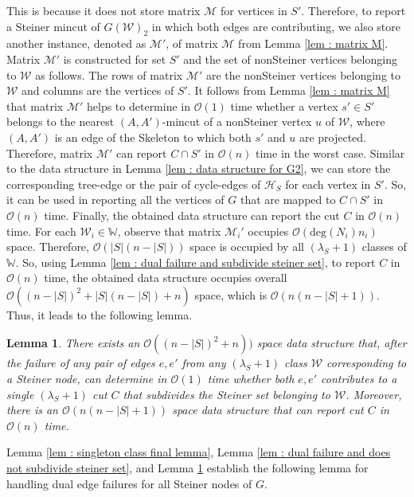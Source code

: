 \documentclass[letterpaper,11pt]{article}
\newtheorem{lemma}{Lemma}[]
\begin{document}
This is because it does not store matrix ${\mathcal M}$ for vertices in $S'$. Therefore, to report a Steiner mincut of $G({\mathcal W})_2$ in which both edges are contributing, we also store another instance, denoted as ${\mathcal M}'$, of matrix ${\mathcal M}$ from Lemma \ref{lem : matrix M}. Matrix ${\mathcal M}'$ is constructed for set $S'$ and the set of nonSteiner vertices belonging to ${\mathcal W}$ as follows. The rows of matrix ${\mathcal M}'$ are the nonSteiner vertices belonging to ${\mathcal W}$ and columns are the vertices of $S'$. It follows from Lemma \ref{lem : matrix M} that matrix ${\mathcal M}'$ helps to determine in ${\mathcal O}(1)$ time whether a vertex $s'\in S'$ belongs to the nearest $(A,A')$-mincut of a nonSteiner vertex $u$ of ${\mathcal W}$, where $(A,A')$ is an edge of the Skeleton to which both $s'$ and $u$ are projected. Therefore, matrix ${\mathcal M}'$ can report $C\cap S'$ in ${\mathcal O}(n)$ time in the worst case. Similar to the data structure in Lemma \ref{lem : data structure for G2}, we can store the corresponding tree-edge or the pair of cycle-edges of ${\mathcal H}_S$ for each vertex in $S'$. So, it can be used in reporting all the vertices of $G$ that are mapped to $C\cap S'$ in ${\mathcal O}(n)$ time. Finally, the obtained data structure can report the cut $C$ in ${\mathcal O}(n)$ time. For each ${\mathcal W}_i\in {\mathbb W}$, observe that matrix ${\mathcal M}_i'$ occupies ${\mathcal O}(\text{deg}(N_i)n_i)$ space. Therefore, ${\mathcal O}(|S|(n-|S|))$ space is occupied by all $(\lambda_S+1)$ classes of ${\mathbb W}$. So, using Lemma \ref{lem : dual failure and subdivide steiner set}, to report $C$ in ${\mathcal O}(n)$ time, 
the obtained data structure occupies overall ${\mathcal O}((n-|S|)^2+|S|(n-|S|)+n)$ space, which is ${\mathcal O}(n(n-|S|+1))$.  Thus,  it leads to the following lemma.
\begin{lemma} \label{lem : dual failure and subdivide steiner set reporting cut}
     There exists an ${\mathcal O}((n-|S|)^2+n))$ space data structure that, after the failure of any pair of edges $e,e'$ from any $(\lambda_S+1)$ class ${\mathcal W}$ corresponding to a Steiner node, can determine in ${\mathcal O}(1)$ time whether both $e,e'$ contributes to a single $(\lambda_S+1)$ cut $C$ that subdivides the Steiner set belonging to ${\mathcal W}$. Moreover, there is an ${\mathcal O}(n(n-|S|+1))$ space data structure that can report cut $C$ in ${\mathcal O}(n)$ time.
\end{lemma}
Lemma \ref{lem : singleton class final lemma}, Lemma \ref{lem : dual failure and does not subdivide steiner set},  and Lemma \ref{lem : dual failure and subdivide steiner set reporting cut} establish the following lemma for handling dual edge failures for all Steiner nodes of $G$.
\end{document}
